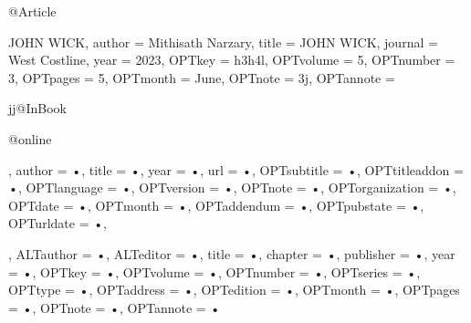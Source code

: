 \documentclass[11pt]{article}
\begin{document}
@Article{JOHN WICK,
author = {Mithisath Narzary},
title = {JOHN WICK},
journal = {West Costline},
year = {2023},
OPTkey = {h3h4l},
OPTvolume = {5},
OPTnumber = {3},
OPTpages = {5},
OPTmonth = {June},
OPTnote = {3j},
OPTannote = {jj@InBook{@online{\usepackage{•} ,
author = {•},
title = {•},
year = {•},
url = {•},
OPTsubtitle = {•},
OPTtitleaddon = {•},
OPTlanguage = {•},
OPTversion = {•},
OPTnote = {•},
OPTorganization = {•},
OPTdate = {•},
OPTmonth = {•},
OPTaddendum = {•},
OPTpubstate = {•},
OPTurldate = {•},
}
,
ALTauthor = {•},
ALTeditor = {•},
title = {•},
chapter = {•},
publisher = {•},
year = {•},
OPTkey = {•},
OPTvolume = {•},
OPTnumber = {•},
OPTseries = {•},
OPTtype = {•},
OPTaddress = {•},
OPTedition = {•},
OPTmonth = {•},
OPTpages = {•},
OPTnote = {•},
OPTannote = {•}
}
}
}
\end{document}
